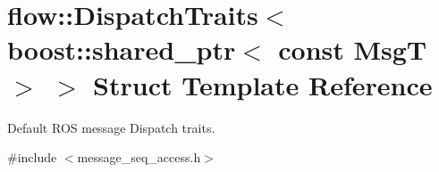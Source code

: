 \hypertarget{structflow_1_1_dispatch_traits_3_01boost_1_1shared__ptr_3_01const_01_msg_t_01_4_01_4}{}\section{flow\+:\+:Dispatch\+Traits$<$ boost\+:\+:shared\+\_\+ptr$<$ const MsgT $>$ $>$ Struct Template Reference}
\label{structflow_1_1_dispatch_traits_3_01boost_1_1shared__ptr_3_01const_01_msg_t_01_4_01_4}


Default R\+OS message Dispatch traits.  




{\ttfamily \#include $<$message\+\_\+seq\+\_\+access.\+h$>$}

